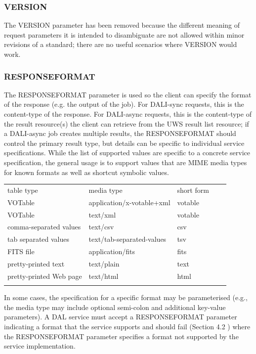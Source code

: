 \documentclass[11pt,letter]{ivoa}
\begin{document}
\subsubsection{VERSION}
\label{sec:VERSION}
The VERSION parameter has been removed because the different 
meaning of request 
parameters it is intended to disambiguate are not allowed within minor 
revisions of a standard; there are no useful scenarios where VERSION would work.

\subsubsection{RESPONSEFORMAT}
\label{sec:RESPONSEFORMAT}
The RESPONSEFORMAT parameter is used so the client can specify the format of the 
response (e.g. the output of the job). For DALI-sync requests, this is the 
content-type of the response. For DALI-async requests, this is the content-type 
of the result resource(s) the client can retrieve from the UWS result list 
resource; if a DALI-async job creates multiple results, the RESPONSEFORMAT 
should control the primary result type, but details can be specific to 
individual service specifications. While the list of supported values are 
specific to a concrete service specification, the general usage is to support 
values that are MIME media types \citep{std:MIME} for known 
formats as well as 
shortcut symbolic values. 

\begin{tabular}{l l l l l}
\sptablerule
table type & media type & short form \\
\sptablerule
VOTable & application/x-votable+xml & votable & \\
VOTable & text/xml & votable & \\
comma-separated values & text/csv & csv & \\
tab separated values & text/tab-separated-values & tsv & \\
FITS file & application/fits & fits & \\
pretty-printed text & text/plain & text & \\
pretty-printed Web page & text/html & html & \\
\sptablerule
\label{tab:mimetypes}
\end{tabular}

In some cases, the specification for a specific format may be parameterised 
(e.g., the media type may include optional semi-colon and additional key-value 
parameters). A DAL service must accept a RESPONSEFORMAT parameter indicating a 
format that the service supports and should  fail (Section 4.2 ) where the 
RESPONSEFORMAT parameter specifies a format not supported by the service 
implementation.
\end{document}
